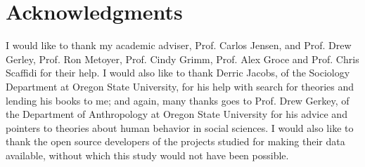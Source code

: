 \documentclass[12pt,letterpaper]{gthesis2}  %
\begin{document}
\section*{Acknowledgments}
\label{acknowledgments}
I would like to thank my academic adviser, Prof. Carlos Jensen, and Prof. Drew Gerley, Prof. Ron Metoyer, Prof. Cindy Grimm, Prof. Alex Groce and Prof. Chris Scaffidi for their help. I would also like to thank Derric Jacobs, of the Sociology Department at Oregon State University, for his help with search for theories and lending his books to me; and again, many thanks goes to Prof. Drew Gerkey, of the Department of Anthropology at Oregon State University for his advice and pointers to theories about human behavior in social sciences. I would also like to thank the open source developers of the projects studied for making their data available, without which this study would not have been possible. \\

%

\pagebreak
\end{document}

